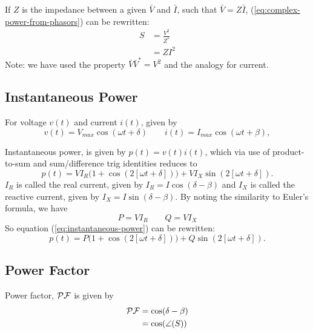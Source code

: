 \documentclass{homework}
\begin{document}
If $Z$ is the impedance between a given $\bar{V}$ and $\bar{I}$,
such that $\bar{V} = Z \bar{I}$,
(\ref{eq:complex-power-from-phasors})
can be rewritten:
\begin{align}
    S &= \frac{V^2}{Z^*}
        \label{eq:complex-power-from-voltage} \\
        &= ZI^2
        \label{eq:complex-power-from-current}
\end{align}
Note: we have used the property $\bar{V}\bar{V}^* = V^2$
and the analogy for current.

\subsection{Instantaneous Power}
For voltage $v(t)$ and current $i(t)$, given by
\begin{equation}
    v(t) = V_{max} \cos(\omega t + \delta) \qquad
        i(t) = I_{max} \cos(\omega t + \beta),
\end{equation}

Instantaneous power, is given by $p(t) = v(t)i(t)$,
which via use of product-to-sum and sum/difference trig identities
reduces to
\begin{equation}
    p(t) = VI_R\biggl( 1 + \cos(2[\omega t + \delta])\biggr)
        + VI_X \sin(2[\omega t + \delta]).
    \label{eq:instantaneous-power-raw}
\end{equation}
$I_R$ is called the real current, given by
$I_R = I \cos(\delta - \beta)$
and $I_X$ is called the reactive current, given by
$I_X = I \sin(\delta - \beta)$. By noting the similarity
to Euler's formula, we have
\begin{equation}
    P = VI_R \qquad Q = VI_X
    \label{eq:instantaneous-to-complex-relation}
\end{equation}
So equation (\ref{eq:instantaneous-power}) can be rewritten:
\begin{equation}
    p(t) = P\biggl( 1 + \cos(2[\omega t + \delta])\biggr)
        + Q \sin(2[\omega t + \delta]).
    \label{eq:instantaneous-power}
\end{equation}

\subsection{Power Factor}
Power factor, $\mathcal{PF}$ is given by
\begin{align}
    \mathcal{PF} &= \cos(\delta - \beta) 
    \label{eq:power-factor} \\
        &= \cos(\angle(S))
    \label{eq:power-factor-complex}
\end{align}
\end{document}

